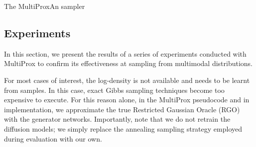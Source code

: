\begin{algorithm}%
    \caption{The MultiProxAn sampler}
    \label{alg:multiproxan}
    \begin{algorithmic}
        \ENDIF
        \ENDFOR
        \ENDFOR
    \end{algorithmic}
\end{algorithm}

\subsection{Experiments}

In this section, we present the results of a series of experiments conducted with MultiProx to confirm its effectiveness at sampling from multimodal distributions.

For most cases of interest, the log-density is not available and needs to be learnt from samples. In this case, exact Gibbs sampling techniques become too expensive to execute. For this reason alone, in the MultiProx pseudocode and in implementation, we approximate the true Restricted Gaussian Oracle (RGO) with the generator networks. Importantly, note that we do not retrain the diffusion models; we simply replace the annealing sampling strategy employed during evaluation with our own.

